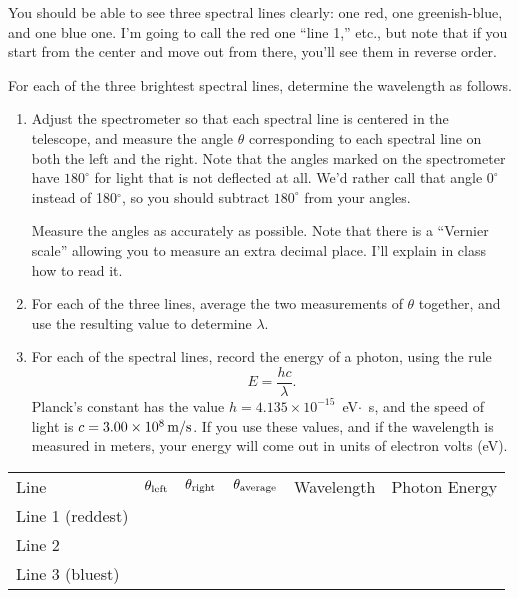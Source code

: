 You should be able to see three spectral lines clearly: one red,
one greenish-blue, and one blue one. I'm going to call the red one
``line 1,'' etc., but note that if you start from the center and
move out from there, you'll see them in reverse order.

For each of the three brightest spectral lines, determine
the wavelength as follows.  

\begin{enumerate}
\item Adjust the spectrometer so that each spectral
line is centered in the telescope, and measure the angle $\theta$
corresponding to each spectral line on both the left and the right.
Note that the angles marked on the spectrometer have $180^\circ$
for light that is not deflected at all.  We'd rather
call that angle $0^\circ$ instead of 180$^\circ$, so you should
subtract $180^\circ$ from your angles.

Measure the angles as accurately as possible.  Note that there is 
a ``Vernier scale'' allowing you to measure an extra decimal place.
I'll explain in class how to read it.

\pagebreak[3]

\item For each of the three lines, average the two measurements of
$\theta$ together, and use the resulting value to determine $\lambda$.

\item For each of the spectral lines, record the energy of a photon,
using the rule 
$$
E=\frac{hc}{\lambda}.
$$
Planck's constant has the value $h=4.135\times 10^{-15}$~eV$\cdot$~s, and
the speed of light is $c=3.00\times 10^8\,{\rm m/s}$.  If you use these
values, and if the wavelength is measured in meters, your energy
will come out in units of electron volts (eV).
\end{enumerate}

{\renewcommand{\arraystretch}{2.0}
{\centering \begin{tabular}{|l|C{0.6in}|C{0.6in}|C{0.6in}|c|c|}
\hline 
 Line  & $\theta_{\rm left}$   & $\theta_{\rm right}$   & $\theta_{\rm average}$ & Wavelength  & Photon Energy \\ 
\hhline{|=|=|=|=|=|=|}
Line 1 (reddest)  & & & & & \\ \hline
Line 2   & & & & & \\ \hline
Line 3 (bluest) & & & & & \\ \hline
\end{tabular}\par}}

